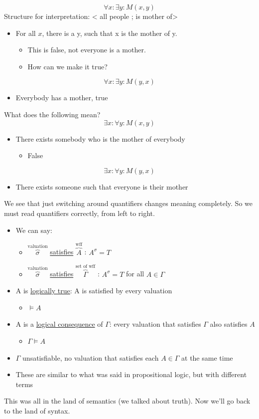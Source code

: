 \documentclass[11pt]{article}
\begin{document}
$$\forall x : \exists y : M(x,y)$$
Structure for interpretation: < all people ; is mother of>
\begin{itemize}
\item For all \(x\), there is a y, such that x is the mother of y.
\begin{itemize}
\item This is false, not everyone is a mother.
\item How can we make it true?
\end{itemize}
\end{itemize}
$$ \forall x : \exists y : M(y,x)$$
\begin{itemize}
\item Everybody has a mother, true
\end{itemize}
What does the following mean?
$$\exists x : \forall y : M(x,y)$$
\begin{itemize}
\item There exists somebody who is the mother of everybody
\begin{itemize}
\item False
\end{itemize}
\end{itemize}
$$\exists x : \forall y : M(y,x)$$
\begin{itemize}
\item There exists someone such that everyone is their mother
\end{itemize}
We see that just switching around quantifiers changes meaning completely. So we must read quantifiers correctly, from left to right.
\begin{itemize}
\item We can say:
\begin{itemize}
\item \(\overbrace{\sigma}^{\text{valuation}}\) \uline{satisfies} \(\overbrace{A}^{\text{wff}}\) : \(A^{\sigma}=T\)
\item \(\overbrace{\sigma}^{\text{valuation}}\) \uline{satisfies} \(\overbrace{\Gamma}^{\text{set of wff}}\) : \(A^{\sigma}=T\) for all \(A \in \Gamma\)
\end{itemize}
\item A is \uline{logically true}: A is satisfied by every valuation
\begin{itemize}
\item \(\models A\)
\end{itemize}
\item A is a \uline{logical consequence} of \(\Gamma\): every valuation that satisfies \(\Gamma\) also satisfies \(A\)
\begin{itemize}
\item \(\Gamma \models A\)
\end{itemize}
\item \(\Gamma\) unsatisfiable, no valuation that satisfies each \(A \in \Gamma\) at the same time
\item These are similar to what was said in propositional logic, but with different terms
\end{itemize}
This was all in the land of semantics (we talked about truth). Now we'll go back to the land of syntax.
\end{document}
